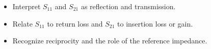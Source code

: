 \begin{objectives}
\begin{itemize}[leftmargin=1.4em,itemsep=2pt]
\item Interpret $S_{11}$ and $S_{21}$ as reflection and transmission.
\item Relate $S_{11}$ to return loss and $S_{21}$ to insertion loss or gain.
\item Recognize reciprocity and the role of the reference impedance.
\end{itemize}
\end{objectives}
